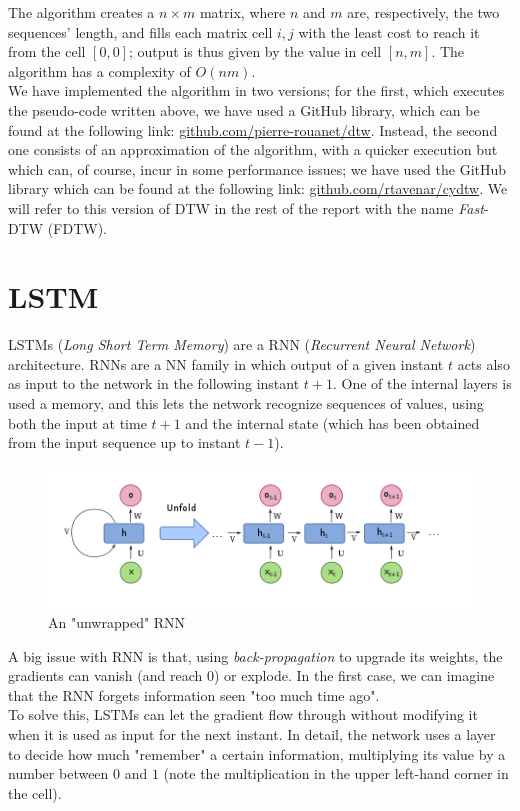 \documentclass[8pt,notitlepage]{report}
\begin{document}
		The algorithm creates a $ n \times m $ matrix, where $ n $ and $ m $ are, respectively, the two sequences' length, and fills each matrix cell $ i, j $ with the least cost to reach it from the cell $ [0, 0] $; output is thus given by the value in cell $ [n, m] $. The algorithm has a complexity of $ O(nm) $.\\
		We have implemented the algorithm in two versions; for the first, which executes the pseudo-code written above, we have used a GitHub library, which can be found at the following link: \href{https://github.com/pierre-rouanet/dtw}{github.com/pierre-rouanet/dtw}. Instead, the second one consists of an approximation of the algorithm, with a quicker execution but which can, of course, incur in some performance issues; we have used the GitHub library which can be found at the following link: \href{https://github.com/rtavenar/cydtw}{github.com/rtavenar/cydtw}. We will refer to this version of DTW in the rest of the report with the name \textit{Fast}-DTW (FDTW).

	\section{LSTM}
		LSTMs (\textit{Long Short Term Memory}) are a RNN (\textit{Recurrent Neural Network}) architecture. RNNs are a NN family in which output of a given instant $ t $ acts also as input to the network in the following instant $ t + 1 $. One of the internal layers is used a memory, and this lets the network recognize sequences of values, using both the input at time $ t + 1 $ and the internal state (which has been obtained from the input sequence up to instant $ t - 1$).
		
		\begin{figure}[H]
			\begin{center}
				\includegraphics[scale=.55]{rnn}
				\caption{An "unwrapped" RNN}
			\end{center}
		\end{figure}

		A big issue with RNN is that, using \textit{back-propagation} to upgrade its weights, the gradients can vanish (and reach $ 0 $) or explode. In the first case, we can imagine that the RNN forgets information seen "too much time ago". \\
		To solve this, LSTMs can let the gradient flow through without modifying it when it is used as input for the next instant. In detail, the network uses a layer to decide how much "remember" a certain information, multiplying its value by a number between $ 0 $ and $ 1 $ (note the multiplication in the upper left-hand corner in the cell). 
		
\end{document}
